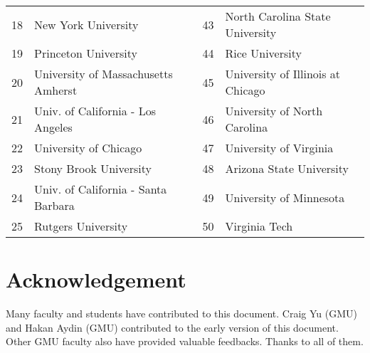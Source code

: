 \documentclass[11pt]{article}
\begin{document}
\begin{table}[ht!]
\begin{tabular}{rl|rl}
    18 & New York University  & 43& North Carolina State University\\
    19 & Princeton University & 44& Rice University \\
    20 & University of Massachusetts Amherst &45& University of Illinois at Chicago  \\
    21 & Univ. of California - Los Angeles &46& University of North Carolina \\
    22 & University of Chicago &47& University of Virginia \\
    23 & Stony Brook University &48& Arizona State University \\
    24 & Univ. of California - Santa Barbara &49& University of Minnesota \\
    25 & Rutgers University &50& Virginia Tech  \\
    \bottomrule
    \end{tabular}
\end{table}

   


\section{Acknowledgement}
Many faculty and students have contributed to this document.
Craig Yu (GMU) and Hakan Aydin (GMU) contributed to the early version of this document. Other GMU faculty also have provided valuable feedbacks.  Thanks to all of them.


\newpage
\end{document}
